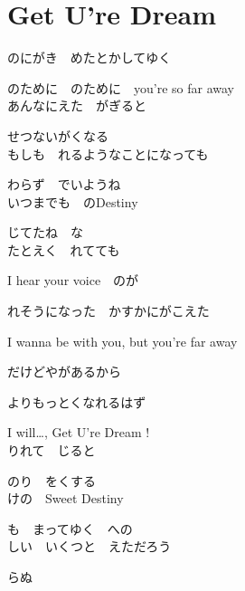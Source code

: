 \section{ Get U're Dream}
\large{

のにがき　めたとかしてゆく

のために　のために　you're so far away
\\

あんなにえた　がぎると

せつないがくなる
\\

もしも　れるようなことになっても

わらず　でいようね
\\

いつまでも　のDestiny

じてたね　な
\\

たとえく　れてても

I hear your voice　のが

れそうになった　かすかにがこえた

I wanna be with you, but you're far away

だけどやがあるから

よりもっとくなれるはず

I will…, Get U're Dream !
\\

りれて　じると

のり　をくする
\\

けの　Sweet Destiny

も　まってゆく　への
\\

しい　いくつと　えただろう

らぬ

}

